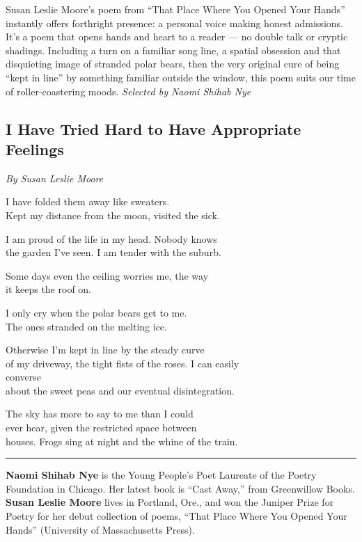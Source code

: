 Susan Leslie Moore's poem from ``That Place Where You Opened Your
Hands'' instantly offers forthright presence: a personal voice making
honest admissions. It's a poem that opens hands and heart to a reader
--- no double talk or cryptic shadings. Including a turn on a familiar
song line, a spatial obsession and that disquieting image of stranded
polar bears, then the very original cure of being ``kept in line'' by
something familiar outside the window, this poem suits our time of
roller-coastering moods. \emph{Selected by Naomi Shihab Nye}

\hypertarget{i-have-tried-hard-to-have-appropriate-feelings}{%
\subsection{I Have Tried Hard to Have Appropriate
Feelings}\label{i-have-tried-hard-to-have-appropriate-feelings}}

\emph{By Susan Leslie Moore}

I have folded them away like sweaters.\\
Kept my distance from the moon, visited the sick.

I am proud of the life in my head. Nobody knows\\
the garden I've seen. I am tender with the suburb.

Some days even the ceiling worries me, the way\\
it keeps the roof on.

I only cry when the polar bears get to me.\\
The ones stranded on the melting ice.

Otherwise I'm kept in line by the steady curve\\
of my driveway, the tight fists of the roses. I can easily\\
 converse\\
about the sweet peas and our eventual disintegration.

The sky has more to say to me than I could\\
ever hear, given the restricted space between\\
houses. Frogs sing at night and the whine of the train.

\begin{center}\rule{0.5\linewidth}{\linethickness}\end{center}

\textbf{Naomi Shihab Nye} is the Young People's Poet Laureate of the
Poetry Foundation in Chicago. Her latest book is ``Cast Away,'' from
Greenwillow Books. \textbf{Susan Leslie Moore} lives in Portland, Ore.,
and won the Juniper Prize for Poetry for her debut collection of poems,
``That Place Where You Opened Your Hands'' (University of Massachusetts
Press).

